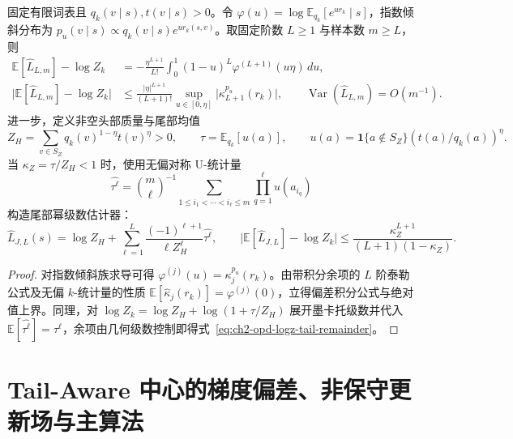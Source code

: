 \documentclass[lang=cn,scheme=chinese,openany]{elegantbook}
\newcommand{\E}{\mathbb E}
\begin{document}
\begin{theorem}
\label{thm:ch2-opd-logz-cumulant}
固定有限词表且 $q_k(v\mid s),t(v\mid s)>0$。令 $\varphi(u)=\log\mathbb E_{q_k}[e^{u r_k}\mid s]$，指数倾斜分布为 $p_u(v\mid s)\propto q_k(v\mid s)e^{u r_k(s,v)}$。取固定阶数 $L\ge1$ 与样本数 $m\ge L$，则
\begin{align}
\mathbb E[\widehat L_{L,m}]-\log Z_k
&=-\frac{\eta^{L+1}}{L!}\int_0^1(1-u)^L\varphi^{(L+1)}(u\eta)\,du,\\
\bigl|\mathbb E[\widehat L_{L,m}]-\log Z_k\bigr|
&\le\frac{|\eta|^{L+1}}{(L+1)!}\sup_{u\in[0,\eta]}\bigl|\kappa_{L+1}^{p_u}(r_k)\bigr|,\qquad
\operatorname{Var}(\widehat L_{L,m})=O(m^{-1}).
\end{align}
进一步，定义非空头部质量与尾部均值
\begin{equation*}
Z_H=\sum_{v\in S_Z}q_k(v)^{1-\eta}t(v)^\eta>0,\qquad
\tau=\E_{q_k}[u(a)],\qquad
u(a)=\mathbf1\{a\notin S_Z\}(t(a)/q_k(a))^\eta.
\end{equation*}
当 $\kappa_Z=\tau/Z_H<1$ 时，使用无偏对称 U-统计量
\begin{equation*}
\widehat{\tau^\ell}=\binom{m}{\ell}^{-1}\sum_{1\le i_1<\cdots<i_\ell\le m}\prod_{q=1}^\ell u(a_{i_q})
\end{equation*}
构造尾部幂级数估计器：
\begin{equation}
\widehat L_{J,L}(s)=\log Z_H+
\sum_{\ell=1}^{L}\frac{(-1)^{\ell+1}}{\ell Z_H^\ell}
\widehat{\tau^\ell},\qquad
\bigl|\mathbb E[\widehat L_{J,L}]-\log Z_k\bigr|
\leq \frac{\kappa_Z^{L+1}}{(L+1)(1-\kappa_Z)}.
\label{eq:ch2-opd-logz-tail-series,eq:ch2-opd-logz-tail-series-estimator,eq:ch2-opd-logz-tail-remainder}
\end{equation}
\end{theorem}
\begin{proof}
对指数倾斜族求导可得 $\varphi^{(j)}(u)=\kappa_j^{p_u}(r_k)$。由带积分余项的 $L$ 阶泰勒公式及无偏 $k$-统计量的性质 $\E[\widehat\kappa_j(r_k)]=\varphi^{(j)}(0)$，立得偏差积分公式与绝对值上界。同理，对 $\log Z_k=\log Z_H+\log(1+\tau/Z_H)$ 展开墨卡托级数并代入 $\E[\widehat{\tau^\ell}]=\tau^\ell$，余项由几何级数控制即得式~\eqref{eq:ch2-opd-logz-tail-remainder}。
\end{proof}

\section{Tail-Aware 中心的梯度偏差、非保守更新场与主算法}
\label{opd:approximate-field}
\end{document}
